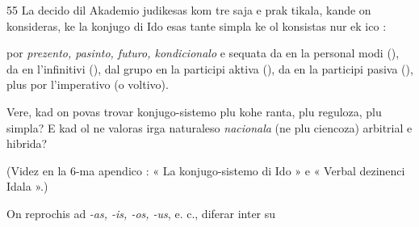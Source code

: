\begin{VUpage}[59]{55}
\VUblancAlinea
La decido dil Akademio judikesas kom tre saja e prak\cc
tikala, kande on konsideras, ke la konjugo di Ido esas tante\nl
simpla ke ol konsistas nur ek ico :

\VUblancAlinea
{} por \textit{prezento, pasinto, futuro, kondicionalo} e\nl
sequata da  en la personal modi (), da  en\nl
l'infinitivi (), dal grupo  en la participi aktiva\nl
(), da  en la participi pasiva (),\nl
plus  por l'imperativo (o voltivo).

\VUblancAlinea
Vere, kad on povas trovar konjugo-sistemo plu kohe\cc
ranta, plu reguloza, plu simpla? E kad ol ne valoras irga\nl
naturaleso \textit{nacionala} (ne plu ciencoza) arbitrial e hibrida?

(Videz en la 6-ma apendico : « La konjugo-sistemo di\nl
Ido » e « Verbal dezinenci Idala ».)

On reprochis ad \textit{-as, -is, -os, -us}, e. c., diferar inter su
\parplein
\end{VUpage}

